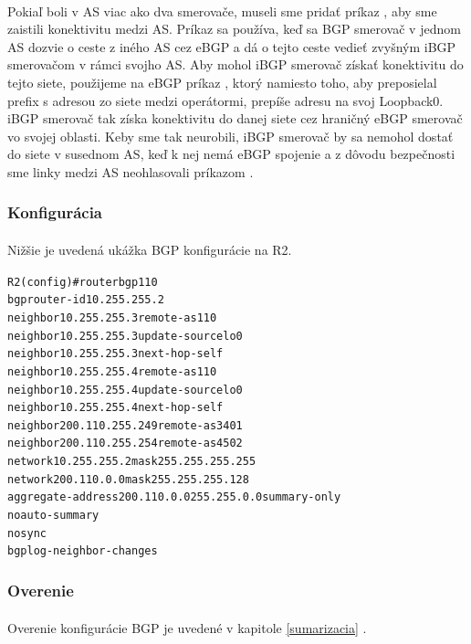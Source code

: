 \documentclass[12pt,twoside,a4paper]{report}
\begin{document}
\paragraph{}
Pokiaľ boli v AS viac ako dva smerovače, museli sme pridať príkaz , aby sme zaistili konektivitu medzi AS. Príkaz  sa používa, keď sa BGP smerovač v jednom AS dozvie o ceste z iného AS cez eBGP a dá o tejto ceste vedieť zvyšným iBGP smerovačom v rámci svojho AS. Aby mohol iBGP smerovač získať konektivitu do tejto siete, použijeme na eBGP príkaz , ktorý namiesto toho, aby preposielal prefix s  adresou zo siete medzi operátormi, prepíše  adresu na svoj Loopback0. iBGP smerovač tak získa konektivitu do danej siete cez hraničný eBGP smerovač vo svojej oblasti. Keby sme tak neurobili, iBGP smerovač by sa nemohol dostať do siete v susednom AS, keď k nej nemá eBGP spojenie a z dôvodu bezpečnosti sme linky medzi AS neohlasovali príkazom .


\subsubsection{Konfigurácia}
\paragraph{}
Nižšie je uvedená ukážka BGP konfigurácie na R2.

\noindent
{\selectfont
\begin{small}
\begin{alltt}
R2(config)#router bgp 110
  bgp router-id 10.255.255.2
  neighbor 10.255.255.3 remote-as 110
  neighbor 10.255.255.3 update-source lo0
  neighbor 10.255.255.3 next-hop-self
  neighbor 10.255.255.4 remote-as 110
  neighbor 10.255.255.4 update-source lo0
  neighbor 10.255.255.4 next-hop-self
  neighbor 200.110.255.249 remote-as 3401
  neighbor 200.110.255.254 remote-as 4502
  network 10.255.255.2 mask 255.255.255.255
  network 200.110.0.0 mask 255.255.255.128
  aggregate-address 200.110.0.0 255.255.0.0 summary-only
  no auto-summary
  no sync
  bgp log-neighbor-changes
\end{alltt}
\end{small}
}


\subsubsection{Overenie}
\paragraph{}
Overenie konfigurácie BGP je uvedené v kapitole \ref{sumarizacia} .
\end{document}
